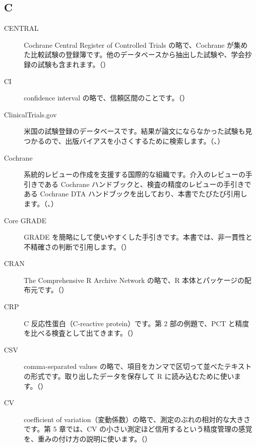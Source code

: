 \subsection*{C}
\begin{description}
\item[CENTRAL] Cochrane Central Register of Controlled Trials の略で、Cochrane が集めた比較試験の登録簿です。他のデータベースから抽出した試験や、学会抄録の試験も含まれます。（）
\item[CI] confidence interval の略で、信頼区間のことです。（）
\item[ClinicalTrials.gov] 米国の試験登録のデータベースです。結果が論文にならなかった試験も見つかるので、出版バイアスを小さくするために検索します。（、）
\item[Cochrane] 系統的レビューの作成を支援する国際的な組織です。介入のレビューの手引きである Cochrane ハンドブックと、検査の精度のレビューの手引きである Cochrane DTA ハンドブックを出しており、本書でたびたび引用します。（、）
\item[Core GRADE] GRADE を簡略にして使いやすくした手引きです。本書では、非一貫性と不精確さの判断で引用します。（）
\item[CRAN] The Comprehensive R Archive Network の略で、R 本体とパッケージの配布元です。（）
\item[CRP] C 反応性蛋白（C-reactive protein）です。第 2 部の例題で、PCT と精度を比べる検査として出てきます。（）
\item[CSV] comma-separated values の略で、項目をカンマで区切って並べたテキストの形式です。取り出したデータを保存して R に読み込むために使います。（）
\item[CV] coefficient of variation（変動係数）の略で、測定のぶれの相対的な大きさです。第 5 章では、CV の小さい測定ほど信用するという精度管理の感覚を、重みの付け方の説明に使います。（）
\end{description}

